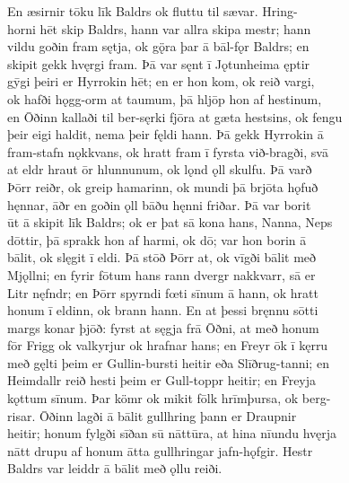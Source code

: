 \documentclass[12pt,letterpaper]{book}
\begin{document}
\begin{linenumbers}
En æsirnir tōku līk Baldrs ok fluttu til sævar.  Hring-\\
horni hēt skip Baldrs, hann var allra skipa mestr; hann\\
vildu goðin fram sętja, ok gǫ̈ra þar ā bāl-fǫr Baldrs; en\\
skipit gekk hvęrgi fram.  Þā var sęnt ī Jǫtunheima ęptir\\
gȳgi þeiri er Hyrrokin hēt; en er hon kom, ok reið vargi,\\
ok hafði hǫgg-orm at taumum, þā hljōp hon af hestinum,\\
en Ōðinn kallaði til ber-sęrki fjōra at gæta hestsins, ok fengu\\
þeir eigi haldit, nema þeir fęldi hann.  Þā gekk Hyrrokin ā\\
fram-stafn nǫkkvans, ok hratt fram ī fyrsta við-bragði, svā\\
at eldr hraut ōr hlunnunum, ok lǫnd ǫll skulfu.  Þā varð\\
Þōrr reiðr, ok greip hamarinn, ok mundi þā brjōta hǫfuð\\
hęnnar, āðr en goðin ǫll bāðu hęnni friðar.  Þā var borit\\
ūt ā skipit līk Baldrs; ok er þat sā kona hans, Nanna, Neps\\
dōttir, þā sprakk hon af harmi, ok dō; var hon borin ā\\
bālit, ok slęgit ī eldi.  Þā stōð Þōrr at, ok vīgði bālit með\\
Mjǫllni; en fyrir fōtum hans rann dvergr nakkvarr, sā er\\
Litr nęfndr; en Þōrr spyrndi fœti sīnum ā hann, ok hratt\\
honum ī eldinn, ok brann hann.  En at þessi bręnnu sōtti\\
margs konar þjōð: fyrst at sęgja frā Ōðni, at með honum\\
fōr Frigg ok valkyrjur ok hrafnar hans; en Freyr ōk ī kęrru\\
með gęlti þeim er Gullin-bursti heitir eða Slīðrug-tanni; en\\
Heimdallr reið hesti þeim er Gull-toppr heitir; en Freyja\\
kǫttum sīnum.  Þar kömr ok mikit fōlk hrīmþursa, ok berg-\\
risar.  Ōðinn lagði ā bālit gullhring þann er Draupnir\\
heitir; honum fylgði sīðan sū nāttūra, at hina nīundu hvęrja\\
nātt drupu af honum ātta gullhringar jafn-hǫfgir.  Hestr\\
Baldrs var leiddr ā bālit með ǫllu reiði.


\end{linenumbers}
\end{document}
